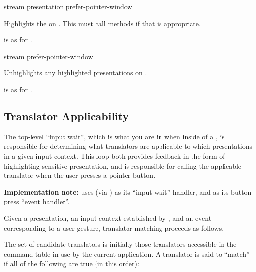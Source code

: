  {stream presentation \optional prefer-pointer-window}

Highlights the   on .  This
must call  methods if that is appropriate.

 is as for .


 {stream \optional prefer-pointer-window}

Unhighlights any highlighted presentations on .

 is as for .


\subsection {Translator Applicability}

The top-level ``input wait'', which is what you are in when inside of a
, is responsible for determining what translators are
applicable to which presentations in a given input context.  This loop both
provides feedback in the form of highlighting sensitive presentation, and is
responsible for calling the applicable translator when the user presses a
pointer button.

{\bf Implementation note:}  uses
 (via
) as its ``input wait'' handler, and
 as its button press ``event
handler''.

Given a presentation, an input context established by ,
and an event corresponding to a user gesture, translator matching proceeds as
follows. 

The set of candidate translators is initially those translators accessible in
the command table in use by the current application.  A translator is said to
``match'' if all of the following are true (in this order):

